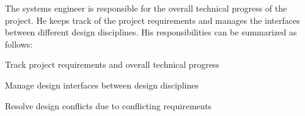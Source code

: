 The systems engineer is responsible for the overall technical progress of the project. He keeps track of the project requirements and manages the interfaces between different design disciplines. His responsibilities can be summarized as follows:

\begin{list}
\item Track project requirements and overall technical progress
\item Manage design interfaces between design disciplines
\item Resolve design conflicts due to conflicting requirements 
\end{list}
